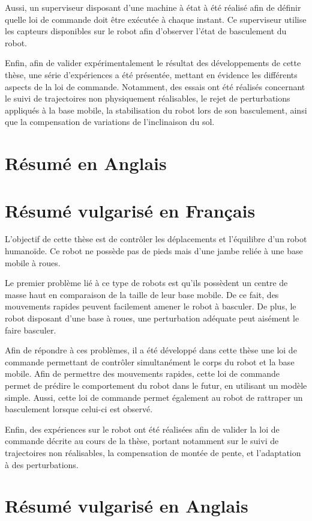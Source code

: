 \documentclass[10pt]{report}
\begin{document}
  Aussi, un superviseur disposant d'une machine à état à été réalisé afin de définir quelle loi de commande doit être exécutée à chaque instant.
  Ce superviseur utilise les capteurs disponibles sur le robot afin d'observer l'état de basculement du robot.
  
  Enfin, afin de valider expérimentalement le résultat des développements de cette thèse, une série d'expériences a été présentée, mettant en évidence les différents aspects de la loi de commande.
  Notamment, des essais ont été réalisés concernant le suivi de trajectoires non physiquement réalisables, le rejet de perturbations appliqués à la base mobile, 
  la stabilisation du robot lors de son basculement, ainsi que la compensation de variations de l'inclinaison du sol.
  
  
\section{Résumé en Anglais}

\section{Résumé vulgarisé en Français}

  L'objectif de cette thèse est de contrôler les déplacements et l'équilibre d'un robot humanoïde.
  Ce robot ne possède pas de pieds mais d'une jambe reliée à une base mobile à roues.
  
  Le premier problème lié à ce type de robots est qu'ils possèdent un centre de masse haut en comparaison de la taille de leur base mobile.
  De ce fait, des mouvements rapides peuvent facilement amener le robot à basculer.
  De plus, le robot disposant d'une base à roues, une perturbation adéquate peut aisément le faire basculer.
  
  Afin de répondre à ces problèmes, il a été développé dans cette thèse une loi de commande permettant de contrôler simultanément le corps du robot et la base mobile.
  Afin de permettre des mouvements rapides, cette loi de commande permet de prédire le comportement du robot dans le futur, en utilisant un modèle simple.
  Aussi, cette loi de commande permet également au robot de rattraper un basculement lorsque celui-ci est observé.
  
  Enfin, des expériences sur le robot ont été réalisées afin de valider la loi de commande décrite au cours de la thèse, portant notamment sur le suivi de trajectoires non réalisables,
  la compensation de montée de pente, et l'adaptation à des perturbations.
  
  
  

\section{Résumé vulgarisé en Anglais}
\end{document}
